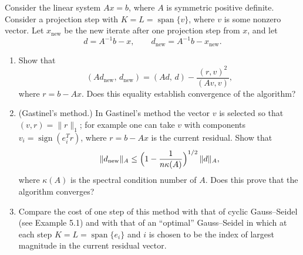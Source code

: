 \documentclass{ctexart}
\begin{document}
  \begin{problem}
Consider the linear system \(Ax=b\), where \(A\) is symmetric positive definite.  
Consider a projection step with \(K=L=\operatorname{span}\{v\}\), where \(v\) is some nonzero vector.  
Let \(x_{\text{new}}\) be the new iterate after one projection step from \(x\), and let
\[
d = A^{-1}b - x,\qquad d_{\text{new}} = A^{-1}b - x_{\text{new}}.
\]

\begin{enumerate}[label=(\alph*)]
  \item Show that
  \[
    (A d_{\text{new}},\, d_{\text{new}})
    = (A d,\, d) - \frac{(r, v)^2}{(A v, v)},
  \]
  where \(r=b-Ax\). Does this equality establish convergence of the algorithm?
  
  \item (Gastinel's method.) In Gastinel's method the vector \(v\) is selected so that
  \((v,r)=\lVert r \rVert_1\); for example one can take \(v\) with components \(v_i=\operatorname{sign}(e_i^T r)\),
  where \(r=b-Ax\) is the current residual. Show that
  \[
    \lVert d_{\text{new}} \rVert_A \le \Bigl(1-\frac{1}{n\kappa(A)}\Bigr)^{1/2}\,\lVert d \rVert_A,
  \]
  where \(\kappa(A)\) is the spectral condition number of \(A\). Does this prove that the algorithm converges?
  
  \item Compare the cost of one step of this method with that of cyclic Gauss--Seidel (see Example 5.1)
  and with that of an “optimal” Gauss--Seidel in which at each step \(K=L=\operatorname{span}\{e_i\}\)
  and \(i\) is chosen to be the index of largest magnitude in the current residual vector.
\end{enumerate}
\end{problem}
\end{document}
